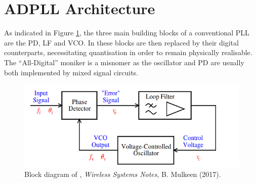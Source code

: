 \section{\acs{ADPLL} Architecture}
As indicated in Figure \ref{fig:mulkeen_pll}, the three main building blocks of a conventional \ac{PLL} are the \ac{PD}, \ac{LF} and \ac{VCO}. In  these blocks are then replaced by their digital counterparts, necessitating quantisation in order to remain physically realisable. The ``All-Digital'' moniker is a misnomer as the oscillator and \acl{PD} are usually both implemented by mixed signal circuits.
\begin{figure}[h]
	\centering
	\includegraphics[scale=0.5]{../tex_files/mulkeen_pll}
	\caption[Block diagram of ]{Block diagram of , \textit{Wireless Systems Notes}, B. Mulkeen (2017).}
	\label{fig:mulkeen_pll}
\end{figure}

